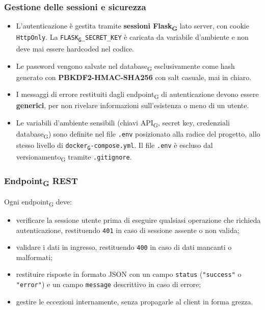\documentclass[11pt,a4paper]{article}
\newcommand{\gls}[1]{#1\textsubscript{G}}
\begin{document}
\subsubsection{Gestione delle sessioni e sicurezza}
 
\begin{itemize}
    \item L'autenticazione è gestita tramite \textbf{sessioni \gls{Flask}} lato server, con cookie \texttt{HttpOnly}. La \texttt{\gls{FLASK}\_SECRET\_KEY} è caricata da variabile d'ambiente e non deve mai essere hardcoded nel codice.
    \item Le password vengono salvate nel \gls{database} esclusivamente come hash generato con \textbf{PBKDF2-HMAC-SHA256} con salt casuale, mai in chiaro.
    \item I messaggi di errore restituiti dagli \gls{endpoint} di autenticazione devono essere \textbf{generici}, per non rivelare informazioni sull'esistenza o meno di un utente.
    \item Le variabili d'ambiente sensibili (chiavi \gls{API}, secret key, credenziali \gls{database}) sono definite nel file \texttt{.env} posizionato alla radice del progetto, allo stesso livello di \texttt{\gls{docker}-compose.yml}. Il file \texttt{.env} è escluso dal \gls{versionamento} tramite \texttt{.gitignore}.
\end{itemize}
 
\subsubsection{\gls{Endpoint} REST}
 
Ogni \gls{endpoint} deve:
\begin{itemize}
    \item verificare la sessione utente prima di eseguire qualsiasi operazione che richieda autenticazione, restituendo \texttt{401} in caso di sessione assente o non valida;
    \item validare i dati in ingresso, restituendo \texttt{400} in caso di dati mancanti o malformati;
    \item restituire risposte in formato JSON con un campo \texttt{status} (\texttt{"success"} o \texttt{"error"}) e un campo \texttt{message} descrittivo in caso di errore;
    \item gestire le eccezioni internamente, senza propagarle al client in forma grezza.
\end{itemize}
 
\end{document}
